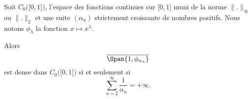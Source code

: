 \begin{theorem}  \label{ThoAEYDdHp}
    Soit \( C_0\big( \mathopen[ 0 , 1 \mathclose] \big)\), l'espace des fonctions continues sur \( \mathopen[ 0 , 1 \mathclose]\) muni de la norme \( \| . \|_{\infty}\) ou \( \| . \|_2\) et une suite \( (\alpha_n)\) strictement croissante de nombres positifs. Nous notons \( \phi_{\lambda}\) la fonction \( x\mapsto x^{\lambda}\).

    Alors 
    \begin{equation}
        \overline{  \Span\{1, \phi_{\alpha_n} \} }   
    \end{equation}
    est dense dans \( C_0\big( \mathopen[ 0 , 1 \mathclose] \big)\)  si et seulement si 
    \begin{equation}
        \sum_{n=2}^{\infty}\frac{1}{ \alpha_n }=+\infty.
    \end{equation}
\end{theorem}

